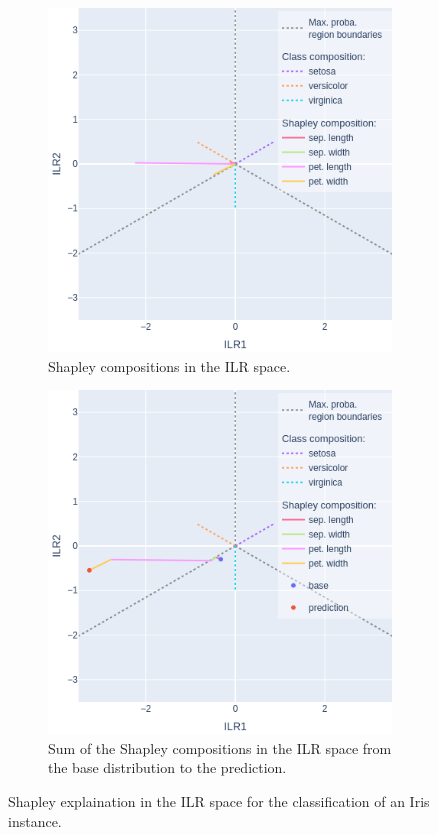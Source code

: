 \documentclass{article}
\theoremstyle{plain}
\theoremstyle{definition}
\theoremstyle{remark}
\begin{document}
\begin{figure}

  \begin{subfigure}{0.5\textwidth}
    \centering
    \includegraphics[width=0.8\linewidth]{figures/3classes/ilrplot.png}
    \caption{Shapley compositions in the ILR space.}
    \label{fig:3classesshap}
  \end{subfigure}
  
\vspace{0.5cm}
  \begin{subfigure}{0.5\textwidth}
    \centering
    \includegraphics[width=0.8\linewidth]{figures/3classes/ilrplotsum.png}
    \caption{Sum of the Shapley compositions in the ILR space from the base distribution to the prediction.}
    \label{fig:3classesshapsum}
  \end{subfigure}
  
  \caption{Shapley explaination in the ILR space for the classification of an Iris instance.}
  \label{fig:3classes}
\end{figure}
\end{document}
